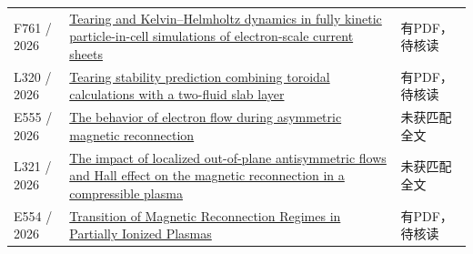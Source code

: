 \begin{longtable}{P{24mm}P{97mm}P{27mm}}
F761 / 2026 & \href{https://doi.org/10.1063/5.0336253}{Tearing and Kelvin–Helmholtz dynamics in fully kinetic particle-in-cell simulations of electron-scale current sheets} & 有PDF，待核读\\

L320 / 2026 & \href{https://doi.org/10.1088/1361-6587/ae7156}{Tearing stability prediction combining toroidal calculations with a two-fluid slab layer} & 有PDF，待核读\\

E555 / 2026 & \href{https://doi.org/10.1088/1402-4896/ae52bc}{The behavior of electron flow during asymmetric magnetic reconnection} & 未获匹配全文\\

L321 / 2026 & \href{https://doi.org/10.1140/epjd/s10053-025-01116-5}{The impact of localized out-of-plane antisymmetric flows and Hall effect on the magnetic reconnection in a compressible plasma} & 未获匹配全文\\

E554 / 2026 & \href{https://doi.org/10.3847/1538-4357/ae91d4}{Transition of Magnetic Reconnection Regimes in Partially Ionized Plasmas} & 有PDF，待核读\\

\bottomrule\end{longtable}\normalsize